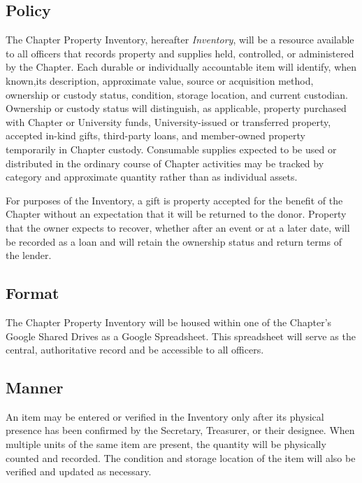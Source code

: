 
\subsection{Policy} \label{V.1}
The Chapter Property Inventory, hereafter \textit{Inventory}, will be a resource available to all officers that records property and supplies held, controlled, or administered by the Chapter. 
Each durable or individually accountable item will identify, when known,its description, approximate value, source or acquisition method, ownership or custody status, condition, storage location, and current custodian. 
Ownership or custody status will distinguish, as applicable, property purchased with Chapter or University funds, University-issued or transferred property, accepted in-kind gifts, third-party loans, and member-owned property temporarily in Chapter custody. 
Consumable supplies expected to be used or distributed in the ordinary course of Chapter activities may be tracked by category and approximate quantity rather than as individual assets.

For purposes of the Inventory, a gift is property accepted for the benefit of the Chapter without an expectation that it will be returned to the donor. 
Property that the owner expects to recover, whether after an event or at a later date, will be recorded as a loan and will retain the ownership status and return terms of the lender.

\subsection{Format} \label{V.2}
The Chapter Property Inventory will be housed within one of the Chapter’s Google Shared Drives as a Google Spreadsheet. 
This spreadsheet will serve as the central, authoritative record and be accessible to all officers.

\subsection{Manner} \label{V.3}
An item may be entered or verified in the Inventory only after its physical presence has been confirmed by the Secretary, Treasurer, or their designee. 
When multiple units of the same item are present, the quantity will be physically counted and recorded. 
The condition and storage location of the item will also be verified and updated as necessary.

